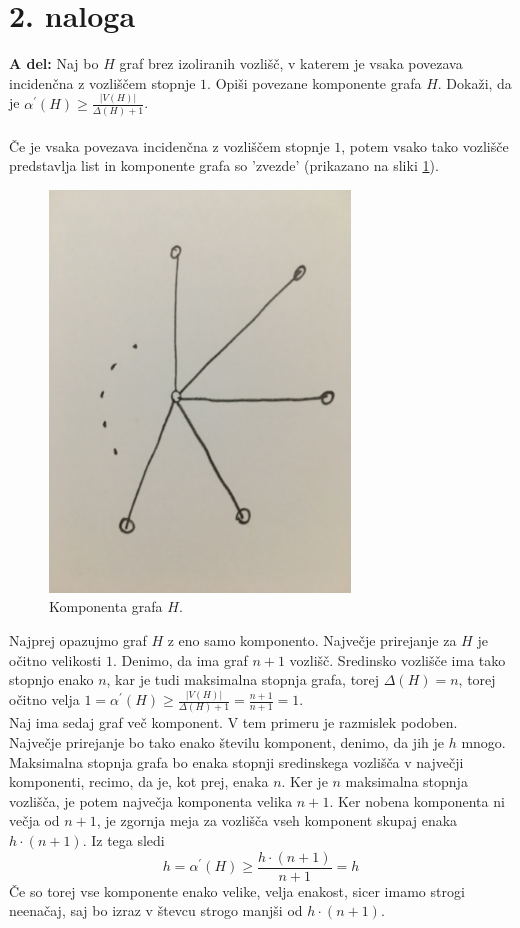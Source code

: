 \documentclass[a4paper,11pt]{article}
\begin{document}
\newpage
\section*{2. naloga}

\textbf{A del:}
Naj bo $H$ graf brez izoliranih vozlišč, v katerem je vsaka povezava incidenčna z vozliščem stopnje $1$. Opiši povezane komponente grafa $H$. Dokaži, da je $\alpha^{'}(H) \geq \frac{|V(H)|}{\Delta (H) + 1}$.
\\
\\
Če je vsaka povezava incidenčna z vozliščem stopnje $1$, potem vsako tako vozlišče predstavlja list in komponente grafa so 'zvezde' (prikazano na sliki \ref{zvezda}).
\begin{figure}[ht!]
    \centering
    \includegraphics[width=80mm]{Slike/zvezda.JPG}
    \caption{Komponenta grafa $H$.}\label{zvezda}
\end{figure}

\noindent
Najprej opazujmo graf $H$ z eno samo komponento.
Največje prirejanje za $H$ je očitno velikosti $1$. 
Denimo, da ima graf $n + 1$ vozlišč. Sredinsko vozlišče ima tako stopnjo enako $n$, kar je tudi maksimalna stopnja grafa, torej $\Delta(H) = n$, torej očitno velja $1 = \alpha^{'}(H) \geq \frac{|V(H)|}{\Delta (H) + 1} = \frac{n + 1}{n + 1} = 1$. 
\\
Naj ima sedaj graf več komponent. V tem primeru je razmislek podoben. Največje prirejanje bo tako enako številu komponent, denimo, da jih je $h$ mnogo.
Maksimalna stopnja grafa bo enaka stopnji sredinskega vozlišča v največji komponenti, recimo, da je, kot prej, enaka $n$. 
Ker je $n$ maksimalna stopnja vozlišča, je potem največja komponenta velika $n + 1$. Ker nobena komponenta ni večja od $n + 1$, je zgornja meja za vozlišča vseh komponent skupaj enaka $h \cdot (n + 1)$. Iz tega sledi
$$
h = \alpha^{'}(H) \geq \frac{h \cdot (n + 1)}{n + 1} = h
$$
Če so torej vse komponente enako velike, velja enakost, sicer imamo strogi neenačaj, saj bo izraz v števcu strogo manjši od $h \cdot (n + 1)$.
\\
\end{document}
